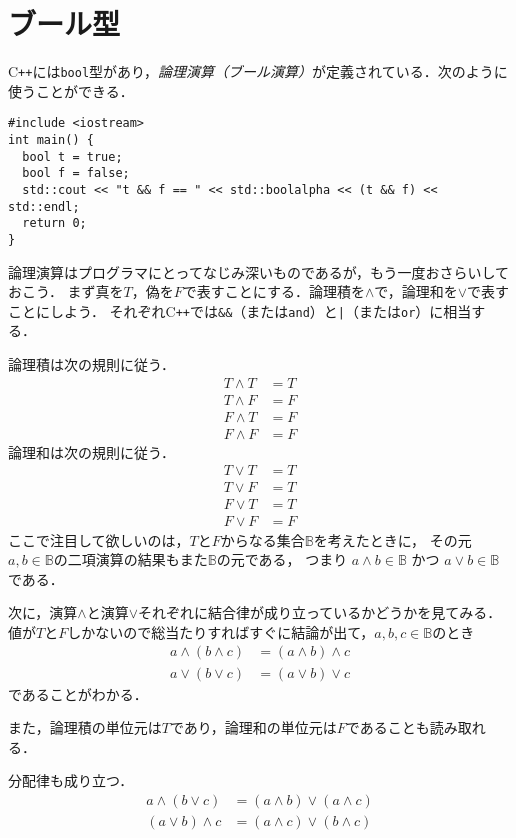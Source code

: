 \documentclass{jsbook}
\newcommand{\cxx}{\textrm{C}\texttt{++}}
\newcommand{\ccode}[1]{\texttt{#1}}
\newcommand{\keyword}[1]{\emph{#1}}
\begin{document}
\section{ブール型}

\cxx には\ccode{bool}型があり，\keyword{論理演算（ブール演算）}が定義されている．次のように使うことができる．
\begin{verbatim}
#include <iostream>
int main() {
  bool t = true;
  bool f = false;
  std::cout << "t && f == " << std::boolalpha << (t && f) << std::endl;
  return 0;
}
\end{verbatim}

論理演算はプログラマにとってなじみ深いものであるが，もう一度おさらいしておこう．
まず真を$T$，偽を$F$で表すことにする．論理積を$\wedge$で，論理和を$\vee$で表すことにしよう．
それぞれ\cxx では\ccode{\&\&}（または\ccode{and}）と\ccode{|}（または\ccode{or}）に相当する．

論理積は次の規則に従う．
\begin{align}
T\wedge T&=T\\
T\wedge F&=F\\
F\wedge T&=F\\
F\wedge F&=F
\end{align}
論理和は次の規則に従う．
\begin{align}
T\vee T&=T\\
T\vee F&=T\\
F\vee T&=T\\
F\vee F&=F
\end{align}
ここで注目して欲しいのは，$T$と$F$からなる集合$\mathbb{B}$を考えたときに，
その元$a,b\in\mathbb{B}$の二項演算の結果もまた$\mathbb{B}$の元である，
つまり $a\wedge b\in\mathbb{B}$ かつ $a\vee b\in\mathbb{B}$ である．

次に，演算$\wedge$と演算$\vee$それぞれに結合律が成り立っているかどうかを見てみる．
値が$T$と$F$しかないので総当たりすればすぐに結論が出て，$a,b,c\in\mathbb{B}$のとき
\begin{align}
a\wedge(b\wedge c)&=(a\wedge b)\wedge c\\
a\vee(b\vee c)&=(a\vee b)\vee c
\end{align}
であることがわかる．

また，論理積の単位元は$T$であり，論理和の単位元は$F$であることも読み取れる．

分配律も成り立つ．
\begin{align}
a\wedge(b\vee c)&=(a\wedge b)\vee(a\wedge c)\\
(a\vee b)\wedge c&=(a\wedge c)\vee(b\wedge c)
\end{align}
\end{document}
